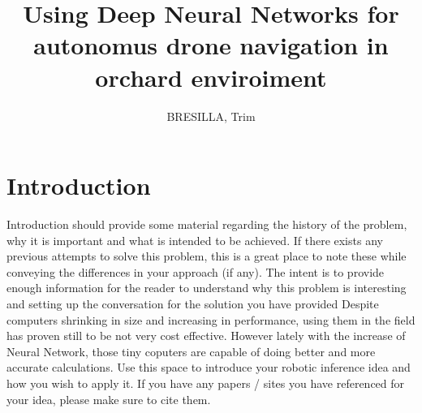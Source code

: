\documentclass[10pt,journal,compsoc]{IEEEtran}
\begin{document}
\title{Using Deep Neural Networks for autonomus drone navigation in orchard enviroiment}

\author{BRESILLA, Trim}

%
{}


\maketitle
\IEEEdisplaynontitleabstractindextext
\IEEEpeerreviewmaketitle
\section{Introduction}
\label{sec:introduction}

 Introduction should provide some material regarding the history of the problem, why it is important and what is intended to be achieved. If there exists any previous attempts to solve this problem, this is a great place to note these while conveying the differences in your approach (if any). The intent is to provide enough information for the reader to understand why this problem is interesting and setting up the conversation for the solution you have provided
Despite computers shrinking in size and increasing in performance, using them in the field has proven still to be not very cost effective. However lately with the increase of Neural Network, those tiny coputers are capable of doing better and more accurate calculations.
Use this space to introduce your robotic inference idea and how you wish to apply it. 
If you have any papers / sites you have referenced for your idea, please make sure to cite them.
\end{document}

